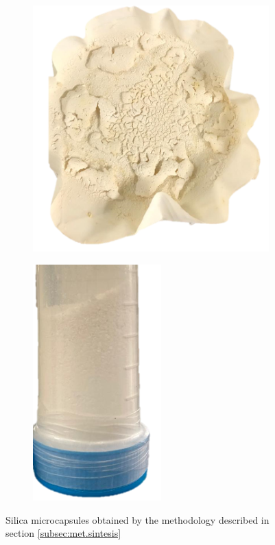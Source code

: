 \begin{refsection}
\begin{figure}[h]
    \centering
    \begin{subfigure}[b]{0.48\linewidth}           \centering
        \includegraphics[width=\linewidth]{Documento_Latex/Tesis 2/Imagenes/capsulas (2).png}
    \end{subfigure}
    \begin{subfigure}[b]{0.48\linewidth}
        \centering
        \includegraphics[width=0.5\linewidth]{Documento_Latex/Tesis 2/Imagenes/capsulas.png}
    \end{subfigure}
    \caption{Silica microcapsules obtained by the methodology described in section \ref{subsec:met.sintesis}}
    \label{fig:capsules}
\end{figure}


\end{refsection}
